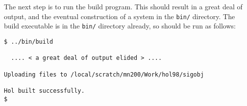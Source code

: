 \noindent The next step is to run the \textsf{build} program.  This should
result in a great deal of output, and the eventual construction of a
\HOL{} system in the \texttt{bin/} directory.  The \textsf{build}
executable is in the \texttt{bin/} directory already, so should be run
as follows:

\begin{session}
\begin{verbatim}
$ ../bin/build

  .... < a great deal of output elided > ....

Uploading files to /local/scratch/mn200/Work/hol98/sigobj

Hol built successfully.
$
\end{verbatim}
\end{session}



